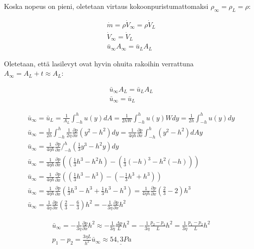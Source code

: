 \documentclass[12pt,a4paper,finnish]{article}
\begin{document}
Koska nopeus on pieni, oletetaan virtaus kokoonpuristumattomaksi $\rho_{\infty} = \rho_L = \rho$:

\begin{align}
 &\dot{m} = \rho\dot{V}_{\infty} = \rho\dot{V}_L\\
 &\dot{V}_{\infty} = \dot{V}_L\\
 &\bar{u}_{\infty}A_{\infty} = \bar{u}_LA_L
\end{align}

Oletetaan, että lasilevyt ovat hyvin ohuita rakoihin verrattuna $A_{\infty} = A_L + t \approx A_L$:

\begin{align}
 &\bar{u}_{\infty}A_L = \bar{u}_LA_L\\
 &\bar{u}_{\infty} = \bar{u}_L
\end{align}

\begin{align}
 &\bar{u}_{\infty} = \bar{u}_L = \frac{1}{A_L}\int_{-h}^{h}u(y)dA = \frac{1}{2hW}\int_{-h}^{h}u(y)Wdy
  = \frac{1}{2h}\int_{-h}^{h}u(y)dy\\
 &\bar{u}_{\infty} = \frac{1}{2h}\int_{-h}^{h}\frac{1}{2\eta}\frac{\partial p}{\partial x}(y^2 - h^2)dy
  = \frac{1}{4\eta h}\frac{\partial p}{\partial x}\int_{-h}^{h}(y^2 - h^2)dAy\\
 &\bar{u}_{\infty} = \frac{1}{4\eta h}\frac{\partial p}{\partial x}
  \bigg/_{-h}^{h}\left(\frac{1}{3}y^3 - h^2y\right)dy\\
 &\bar{u}_{\infty} = \frac{1}{4\eta h}\frac{\partial p}{\partial x}
  \left( \left(\frac{1}{3}h^3 - h^2h\right) - \left(\frac{1}{3}(-h)^3 - h^2(-h)\right) \right)\\
 &\bar{u}_{\infty} = \frac{1}{4\eta h}\frac{\partial p}{\partial x}
  \left( \left(\frac{1}{3}h^3 - h^3\right) - \left(-\frac{1}{3}h^3 + h^3\right) \right)\\
 &\bar{u}_{\infty} = \frac{1}{4\eta h}\frac{\partial p}{\partial x}
  \left( \frac{1}{3}h^3 - h^3 + \frac{1}{3}h^3 - h^3\right)
  = \frac{1}{4\eta h}\frac{\partial p}{\partial x}\left( \frac{2}{3} - 2 \right)h^3\\
 &\bar{u}_{\infty} = \frac{1}{4\eta}\frac{\partial p}{\partial x} \left( \frac{2}{3} - \frac{6}{3} \right)h^2
  = -\frac{1}{3\eta}\frac{\partial p}{\partial x}h^2
\end{align}

\begin{align}
 &\bar{u}_{\infty} = -\frac{1}{3\eta}\frac{\partial p}{\partial x}h^2 \approx 
  -\frac{1}{3\eta}\frac{\Delta p}{L}h^2 = -\frac{1}{3\eta}\frac{p_2 - p_1}{L}h^2 = \frac{1}{3\eta}\frac{p_1 - p_2}{L}h^2\\
 &p_1 - p_2 = \frac{3\eta L}{h^2}\bar{u}_{\infty} \approx \underline{54,3 Pa}
\end{align}
\end{document}
